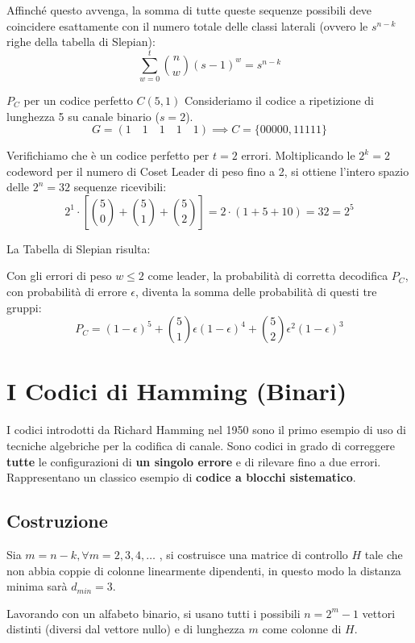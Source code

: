 Affinché questo avvenga, la somma di tutte queste sequenze possibili deve coincidere esattamente con il numero totale delle classi laterali (ovvero le $s^{n-k}$ righe della tabella di Slepian):
$$ \sum_{w=0}^{t} \binom{n}{w}(s-1)^w = s^{n-k} $$

\begin{esempio}{$P_C$ per un codice perfetto $C(5,1)$}
Consideriamo il codice a ripetizione di lunghezza 5 su canale binario ($s=2$).
$$ G=(1 \quad 1 \quad 1 \quad 1 \quad 1) \implies C=\{00000, 11111\} $$

Verifichiamo che è un codice perfetto per $t=2$ errori. Moltiplicando le $2^k=2$ codeword per il numero di Coset Leader di peso fino a 2, si ottiene l'intero spazio delle $2^n=32$ sequenze ricevibili:
$$ 2^1 \cdot \left[ \binom{5}{0} + \binom{5}{1} + \binom{5}{2} \right] = 2 \cdot (1 + 5 + 10) = 32 = 2^5 $$

La Tabella di Slepian risulta:


Con gli errori di peso $w \leq 2$ come leader, la probabilità di corretta decodifica $P_C$, con probabilità di errore $\epsilon$, diventa la somma delle probabilità di questi tre gruppi:
$$ P_C = (1-\epsilon)^5 + \binom{5}{1}\epsilon(1-\epsilon)^4 + \binom{5}{2}\epsilon^2(1-\epsilon)^3 $$
\end{esempio}

 

\section{I Codici di Hamming (Binari)}
I codici introdotti da Richard Hamming nel 1950 sono il primo esempio di uso di tecniche algebriche per la codifica di canale. Sono codici in grado di correggere \textbf{tutte} le configurazioni di \textbf{un singolo errore} e di rilevare fino a due errori. Rappresentano un classico esempio di \textbf{codice a blocchi sistematico}.

\subsection{Costruzione}

Sia $m =n-k, \forall m=2,3,4,\dots$ , si costruisce una matrice di controllo $H$ tale che non abbia coppie di colonne linearmente dipendenti, in questo modo la distanza minima sarà $d_{min}=3$.

Lavorando con un alfabeto binario, si usano tutti i possibili $n=2^m-1$ vettori distinti (diversi dal vettore nullo) e di lunghezza $m$ come colonne di $H$.

